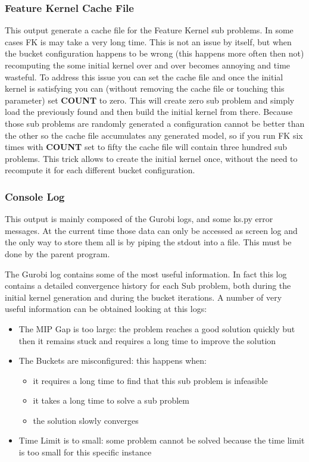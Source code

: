     \subsubsection{Feature Kernel Cache File}
        This output generate a cache file for the Feature Kernel sub problems. In some cases FK is may take a very long time. This is not an issue by itself, but 
        when the bucket configuration happens to be wrong (this happens more often then not) recomputing the some initial kernel over and over becomes annoying and
        time wasteful. To address this issue you can set the cache file and once the initial kernel is satisfying you can (without removing the cache file or touching
        this parameter) set \textbf{COUNT} to zero. This will create zero sub problem and simply load the previously found and then build the initial kernel from there. 
        Because those sub problems are randomly generated a configuration cannot be better than the other so
        the cache file accumulates any generated model, so if you run FK six times with \textbf{COUNT} set to fifty
        the cache file will contain three hundred sub problems. This trick allows to create the initial kernel once, without the need to recompute it for each different 
        bucket configuration. 


    \subsubsection{Console Log}
        This output is mainly composed of the Gurobi logs, and some ks.py error messages. At the current time those data can only be accessed as screen log and 
        the only way to store them all is by piping the stdout into a file. This must be done by the parent program. 

        The Gurobi log contains some of the most useful information. In fact this log contains a detailed convergence history for each Sub problem, both during 
        the initial kernel generation and during the bucket iterations. A number of very useful information can be obtained looking at this logs:
        \begin{itemize}
            \item The MIP Gap is too large: the problem reaches a good solution quickly but then it remains stuck and requires a long time to improve the solution
            \item The Buckets are misconfigured: this happens when:
            \begin{itemize}
                \item it requires a long time to find that this sub problem is infeasible
                \item it takes a long time to solve a sub problem
                \item the solution slowly converges
            \end{itemize}
            \item Time Limit is to small: some problem cannot be solved because the time limit is too small for this specific instance 
        \end{itemize}

